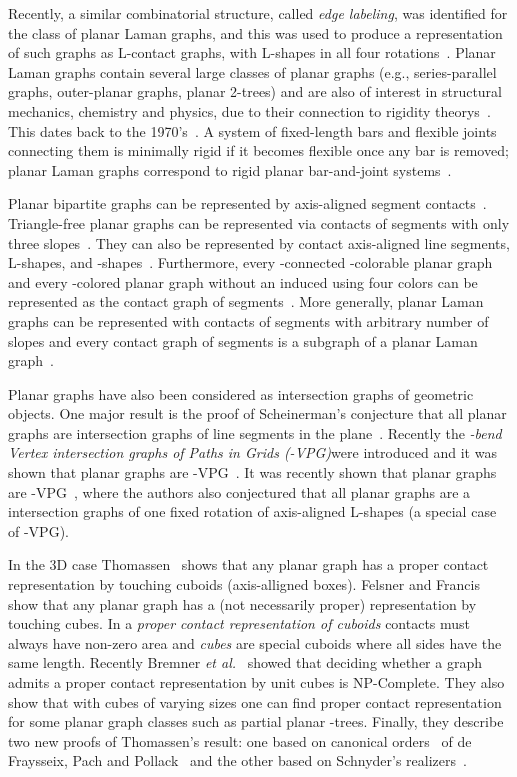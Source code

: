\documentclass{llncs}
\begin{document}
Recently, a similar combinatorial structure, called \emph{edge labeling}, was identified for the class of planar Laman graphs, and  this was used to produce a representation of such graphs as L-contact graphs, with L-shapes in all four rotations~\cite{full}.
 Planar Laman graphs contain several large classes of planar graphs (e.g., series-parallel graphs, outer-planar graphs, planar 2-trees) and are also of interest in structural mechanics, chemistry and physics, due to their connection to rigidity theorys~\cite{hors+-pmrgpt-05}. This dates back to the 1970's~\cite{Laman}. A system of fixed-length bars and flexible joints connecting them is minimally rigid if it becomes flexible once any bar is removed; planar Laman graphs correspond to rigid planar bar-and-joint systems~\cite{hors+-pmrgpt-05}.

Planar bipartite graphs can be represented by axis-aligned segment
contacts~\cite{CzyzowiczKU98,fop-rpgs-91,rt-rplbopg-86}.
Triangle-free planar graphs can be represented via
contacts of segments with only three slopes~\cite{CastroCDMN02}. They can also be represented by contact axis-aligned line segments, L-shapes, and -shapes~\cite{ChaplickU12}.
Furthermore, every -connected -colorable planar graph and every -colored planar graph without an induced  using four colors can be represented as the contact graph of segments~\cite{fo-rcis-07}. More generally, planar Laman graphs can be represented with contacts of segments with arbitrary number of slopes and every contact graph of segments is a subgraph of a planar Laman graph~\cite{A+11}.


Planar graphs have also been considered as intersection graphs of geometric objects. One major result is the proof of Scheinerman's conjecture that all planar graphs are intersection graphs of line segments in the plane~\cite{Chalopin:2009}. Recently the \emph{-bend Vertex intersection graphs of Paths in Grids (-VPG)}were introduced and it was shown that planar graphs are -VPG~\cite{Asinowski2012}. It was recently shown that planar graphs are -VPG~\cite{ChaplickU12}, where the authors also conjectured that all planar graphs are a intersection graphs of one fixed rotation of axis-aligned L-shapes (a special case of -VPG). 

In the 3D case Thomassen~\cite{Thomassen86} shows that any planar graph has a proper contact representation by touching cuboids (axis-alligned boxes). Felsner and Francis~\cite{Felsner11} show that any planar graph has a (not necessarily proper) representation by touching cubes. In a \emph{proper contact representation of cuboids} contacts must always have non-zero area and \emph{cubes} are special cuboids where all sides have the same length.
Recently Bremner {\em et al.}~\cite{cubes12} showed that deciding whether a graph admits a proper contact representation by unit cubes is NP-Complete. They also show that with cubes of varying sizes one can find proper contact representation for some planar graph classes such as partial planar -trees. Finally, they describe two new proofs of Thomassen's result: one based on canonical orders~\cite{fpp-hdpgg-90} of de Fraysseix, Pach and Pollack~\cite{fpp-hdpgg-90} and the other based on Schnyder's realizers~\cite{s-epgg-90}. 
\end{document}
